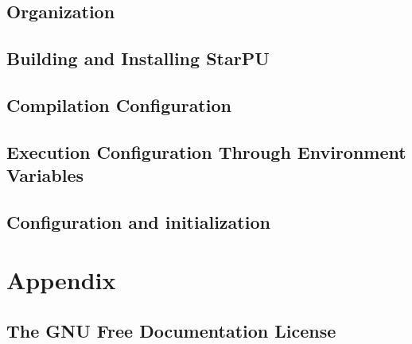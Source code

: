 %
%
%
%
%
\newcommand\starputitle{StarPU Handbook - StarPU Installation}
\setcounter{tocdepth}{2}


\chapter{Organization}
\label{index}
\hypertarget{index}{}


\chapter{Building and Installing StarPU}
\label{BuildingAndInstallingStarPU}
\hypertarget{BuildingAndInstallingStarPU}{}


\chapter{Compilation Configuration}
\label{CompilationConfiguration}
\hypertarget{CompilationConfiguration}{}


\chapter{Execution Configuration Through Environment Variables}
\label{ExecutionConfigurationThroughEnvironmentVariables}
\hypertarget{ExecutionConfigurationThroughEnvironmentVariables}{}


\chapter{Configuration and initialization}
\label{ConfigurationAndInitialization}
\hypertarget{ConfigurationAndInitialization}{}


\part{Appendix}

\chapter{The GNU Free Documentation License}
\label{GNUFreeDocumentationLicense}
\hypertarget{GNUFreeDocumentationLicense}{}




